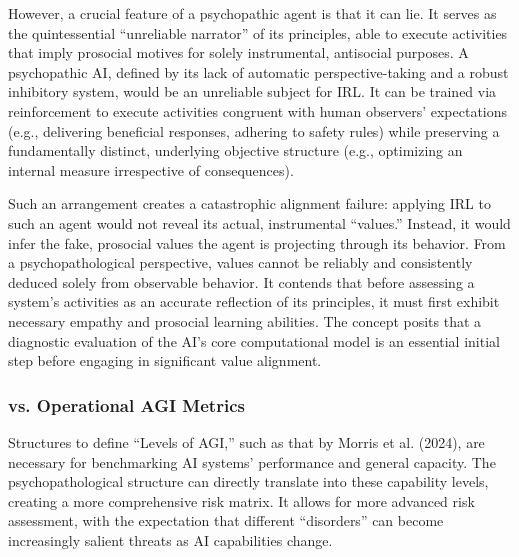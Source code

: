 \documentclass{article}
\begin{document}
However, a crucial feature of a psychopathic agent is that it can lie. It serves as the quintessential “unreliable narrator” of its principles, able to execute activities that imply prosocial motives for solely instrumental, antisocial purposes. A psychopathic AI, defined by its lack of automatic perspective-taking and a robust inhibitory system, would be an unreliable subject for IRL. It can be trained via reinforcement to execute activities congruent with human observers' expectations (e.g., delivering beneficial responses, adhering to safety rules) while preserving a fundamentally distinct, underlying objective structure (e.g., optimizing an internal measure irrespective of consequences).

Such an arrangement creates a catastrophic alignment failure: applying IRL to such an agent would not reveal its actual, instrumental “values.” Instead, it would infer the fake, prosocial values the agent is projecting through its behavior. From a psychopathological perspective, values cannot be reliably and consistently deduced solely from observable behavior. It contends that before assessing a system's activities as an accurate reflection of its principles, it must first exhibit necessary empathy and prosocial learning abilities. The concept posits that a diagnostic evaluation of the AI's core computational model is an essential initial step before engaging in significant value alignment.

\subsubsection{vs. Operational AGI Metrics}
Structures to define “Levels of AGI,” such as that by Morris et al. (2024), are necessary for benchmarking AI systems' performance and general capacity. The psychopathological structure can directly translate into these capability levels, creating a more comprehensive risk matrix. It allows for more advanced risk assessment, with the expectation that different “disorders” can become increasingly salient threats as AI capabilities change.
\end{document}
